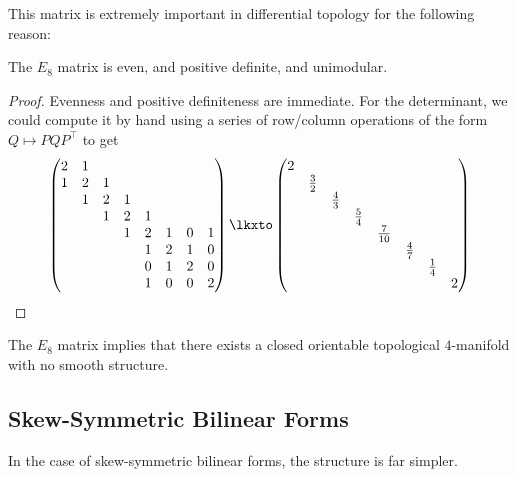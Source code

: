 This matrix is extremely important in differential topology for the following reason:
\begin{proposition}
	The $E_8$ matrix is even, and positive definite, and unimodular.
\end{proposition}
\begin{proof}
	Evenness and positive definiteness are immediate. For the determinant, we could compute it by hand using a series of row/column operations of the form $Q\mapsto PQP^\intercal$ to get
	\[
		\begin{pmatrix}
			2 & 1 &   &   &   &   &   &   \\
			1 & 2 & 1 &   &   &   &   &   \\
			  & 1 & 2 & 1 &   &   &   &   \\
			  &   & 1 & 2 & 1 &   &   &   \\
			  &   &   & 1 & 2 & 1 & 0 & 1 \\
			  &   &   &   & 1 & 2 & 1 & 0 \\
			  &   &   &   & 0 & 1 & 2 & 0 \\
			  &   &   &   & 1 & 0 & 0 & 2 \\
		\end{pmatrix}
		\lkxto
		\begin{pmatrix}
			2 &             &             &             &              &             &             &   \\
			  & \frac{3}{2} &             &             &              &             &             &   \\
			  &             & \frac{4}{3} &             &              &             &             &   \\
			  &             &             & \frac{5}{4} &              &             &             &   \\
			  &             &             &             & \frac{7}{10} &             &             &   \\
			  &             &             &             &              & \frac{4}{7} &             &   \\
			  &             &             &             &              &             & \frac{1}{4} &   \\
			  &             &             &             &              &             &             & 2 \\
		\end{pmatrix}
	\]
\end{proof}

\begin{remark}\label{rmk:E8-manifold}
	The $E_8$ matrix implies that there exists a closed orientable topological $4$-manifold with no smooth structure.  \cite{freedman1982manifold}
\end{remark}


\subsection{Skew-Symmetric Bilinear Forms}

In the case of skew-symmetric bilinear forms, the structure is far simpler.

